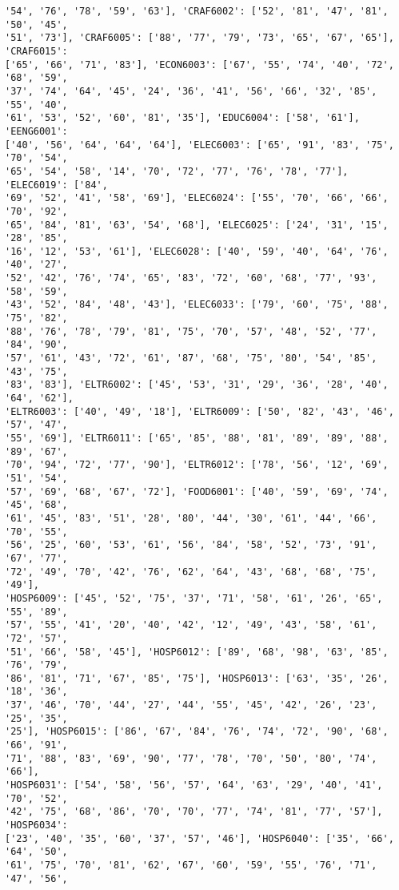 \documentclass[11pt]{article}
\begin{document}
\begin{Verbatim}[commandchars=\\\{\}]
'54', '76', '78', '59', '63'], 'CRAF6002': ['52', '81', '47', '81', '50', '45',
'51', '73'], 'CRAF6005': ['88', '77', '79', '73', '65', '67', '65'], 'CRAF6015':
['65', '66', '71', '83'], 'ECON6003': ['67', '55', '74', '40', '72', '68', '59',
'37', '74', '64', '45', '24', '36', '41', '56', '66', '32', '85', '55', '40',
'61', '53', '52', '60', '81', '35'], 'EDUC6004': ['58', '61'], 'EENG6001':
['40', '56', '64', '64', '64'], 'ELEC6003': ['65', '91', '83', '75', '70', '54',
'65', '54', '58', '14', '70', '72', '77', '76', '78', '77'], 'ELEC6019': ['84',
'69', '52', '41', '58', '69'], 'ELEC6024': ['55', '70', '66', '66', '70', '92',
'65', '84', '81', '63', '54', '68'], 'ELEC6025': ['24', '31', '15', '28', '85',
'16', '12', '53', '61'], 'ELEC6028': ['40', '59', '40', '64', '76', '40', '27',
'52', '42', '76', '74', '65', '83', '72', '60', '68', '77', '93', '58', '59',
'43', '52', '84', '48', '43'], 'ELEC6033': ['79', '60', '75', '88', '75', '82',
'88', '76', '78', '79', '81', '75', '70', '57', '48', '52', '77', '84', '90',
'57', '61', '43', '72', '61', '87', '68', '75', '80', '54', '85', '43', '75',
'83', '83'], 'ELTR6002': ['45', '53', '31', '29', '36', '28', '40', '64', '62'],
'ELTR6003': ['40', '49', '18'], 'ELTR6009': ['50', '82', '43', '46', '57', '47',
'55', '69'], 'ELTR6011': ['65', '85', '88', '81', '89', '89', '88', '89', '67',
'70', '94', '72', '77', '90'], 'ELTR6012': ['78', '56', '12', '69', '51', '54',
'57', '69', '68', '67', '72'], 'FOOD6001': ['40', '59', '69', '74', '45', '68',
'61', '45', '83', '51', '28', '80', '44', '30', '61', '44', '66', '70', '55',
'56', '25', '60', '53', '61', '56', '84', '58', '52', '73', '91', '67', '77',
'72', '49', '70', '42', '76', '62', '64', '43', '68', '68', '75', '49'],
'HOSP6009': ['45', '52', '75', '37', '71', '58', '61', '26', '65', '55', '89',
'57', '55', '41', '20', '40', '42', '12', '49', '43', '58', '61', '72', '57',
'51', '66', '58', '45'], 'HOSP6012': ['89', '68', '98', '63', '85', '76', '79',
'86', '81', '71', '67', '85', '75'], 'HOSP6013': ['63', '35', '26', '18', '36',
'37', '46', '70', '44', '27', '44', '55', '45', '42', '26', '23', '25', '35',
'25'], 'HOSP6015': ['86', '67', '84', '76', '74', '72', '90', '68', '66', '91',
'71', '88', '83', '69', '90', '77', '78', '70', '50', '80', '74', '66'],
'HOSP6031': ['54', '58', '56', '57', '64', '63', '29', '40', '41', '70', '52',
'42', '75', '68', '86', '70', '70', '77', '74', '81', '77', '57'], 'HOSP6034':
['23', '40', '35', '60', '37', '57', '46'], 'HOSP6040': ['35', '66', '64', '50',
'61', '75', '70', '81', '62', '67', '60', '59', '55', '76', '71', '47', '56',

\end{Verbatim}
\end{document}
